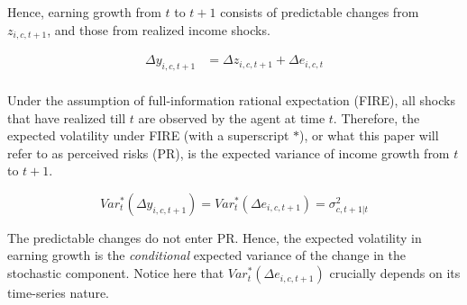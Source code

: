 Hence, earning growth from \(t\) to \(t+1\) consists of predictable changes from
$z_{i,c,t+1}$, and those from realized income shocks.

\begin{equation}
\begin{split}
\label{Eq:IncProcess1}
\Delta y_{i,c,t+1} & =  \Delta z_{i,c,t+1} + \Delta e_{i,c,t} \\
\end{split}
\end{equation}

Under the assumption of full-information rational expectation (FIRE), all shocks that have realized till \(t\) are observed by the agent at
time \(t\). Therefore, the expected volatility under FIRE (with a superscript $*$), or what this paper will refer to as perceived risks (PR), is the expected
variance of income growth from \(t\) to \(t+1\).

\begin{equation}
Var_{t}^*(\Delta y_{i,c,t+1}) =Var_{t}^*(\Delta e_{i,c,t+1}) =\sigma^2_{c,t+1|t}
\end{equation}

The predictable changes do not enter PR. Hence, the expected volatility in earning growth is the \emph{conditional} expected variance of the change in the stochastic component. Notice here that $Var_{t}^*(\Delta e_{i,c,t+1})$ crucially depends on its time-series nature. 



\begin{comment}
Under FIRE, there are a number of testable predictions about the patterns of
perceived risks.

\begin{itemize}
\item
  \textbf{No within-group disagreement}. First, agents who share the same income process have no disagreements
  on perceived risks. This can be checked by comparing
  within-cohort/group dispersion in perceived risks.
\item
  \textbf{State-independence}. Second, the perceived risks under such the assumed process above are
  not dependent on past/recent income realizations. To put it differently, there is no correlation between realized shocks and the perceived risks. This can be tested
  by estimating the correlation between perceived risks and past income
  realizations or their proxies if the latter is not directly observed. 
\item
  \textbf{Correct decomposition}. Third, under the assumed progress, the variances of permanent and transitory
  shocks enter perceived risks with loading of 1.
\end{itemize}

\end{comment}


